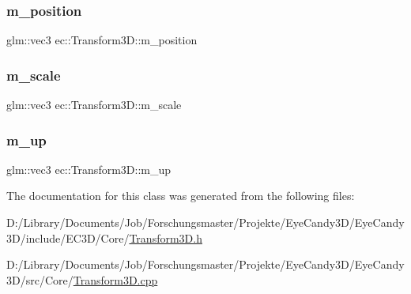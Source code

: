 \subsubsection{\texorpdfstring{m\+\_\+position}{m\_position}}
{\footnotesize\ttfamily glm\+::vec3 ec\+::\+Transform3\+D\+::m\+\_\+position\hspace{0.3cm}{\ttfamily [protected]}}

\mbox{\label{classec_1_1_transform3_d_a8eb8cecaa5ec8273e49c9487e0f6b935}} 
\subsubsection{\texorpdfstring{m\+\_\+scale}{m\_scale}}
{\footnotesize\ttfamily glm\+::vec3 ec\+::\+Transform3\+D\+::m\+\_\+scale\hspace{0.3cm}{\ttfamily [protected]}}

\mbox{\label{classec_1_1_transform3_d_addd1132fb57befe841dfd9af94aa4329}} 
\subsubsection{\texorpdfstring{m\+\_\+up}{m\_up}}
{\footnotesize\ttfamily glm\+::vec3 ec\+::\+Transform3\+D\+::m\+\_\+up\hspace{0.3cm}{\ttfamily [protected]}}



The documentation for this class was generated from the following files\+:\begin{DoxyCompactItemize}
\item 
D\+:/\+Library/\+Documents/\+Job/\+Forschungsmaster/\+Projekte/\+Eye\+Candy3\+D/\+Eye\+Candy3\+D/include/\+E\+C3\+D/\+Core/\mbox{\hyperlink{_transform3_d_8h}{Transform3\+D.\+h}}\item 
D\+:/\+Library/\+Documents/\+Job/\+Forschungsmaster/\+Projekte/\+Eye\+Candy3\+D/\+Eye\+Candy3\+D/src/\+Core/\mbox{\hyperlink{_transform3_d_8cpp}{Transform3\+D.\+cpp}}\end{DoxyCompactItemize}
